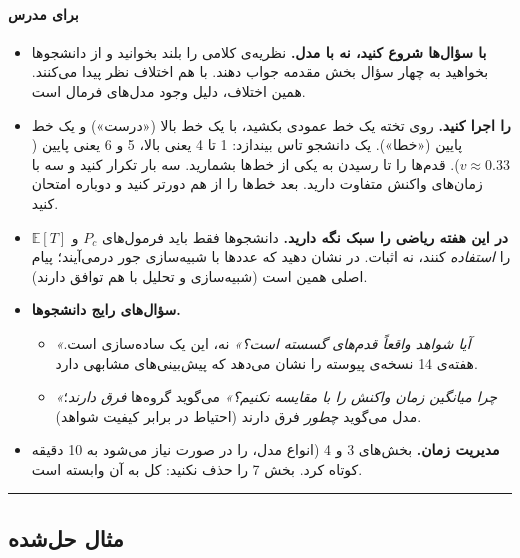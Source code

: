 \paragraph{برای مدرس}

\begin{itemize}
\tightlist
\item
  \textbf{با سؤال‌ها شروع کنید، نه با مدل.} نظریه‌ی کلامی را بلند بخوانید
  و از دانشجوها بخواهید به چهار سؤال بخش مقدمه جواب دهند. با هم اختلاف
  نظر پیدا می‌کنند. همین اختلاف، دلیل وجود مدل‌های فرمال است.
\item
  \textbf{ را اجرا کنید.} روی تخته یک خط عمودی بکشید، با
  یک خط بالا («درست») و یک خط پایین («خطا»). یک دانشجو تاس بیندازد: 1 تا
  4 یعنی بالا، 5 و 6 یعنی پایین (\(v \approx 0.33\)). قدم‌ها را تا رسیدن
  به یکی از خط‌ها بشمارید. سه بار تکرار کنید و سه  با زمان‌های
  واکنش متفاوت دارید. بعد خط‌ها را از هم دورتر کنید و دوباره امتحان کنید.
\item
  \textbf{در این هفته ریاضی را سبک نگه دارید.} دانشجوها فقط باید
  فرمول‌های \(P_c\) و \(\mathbb{E}[T]\) را \emph{استفاده} کنند، نه اثبات.
  در  نشان دهید که عددها با شبیه‌سازی جور درمی‌آیند؛ پیام اصلی
  همین است (شبیه‌سازی و تحلیل با هم توافق دارند).
\item
  \textbf{سؤال‌های رایج دانشجوها.}

  \begin{itemize}
  \tightlist
  \item
    \emph{«آیا شواهد واقعاً قدم‌های گسسته است؟»} نه، این یک ساده‌سازی است.
    هفته‌ی 14 نسخه‌ی پیوسته  را نشان می‌دهد که
    پیش‌بینی‌های مشابهی دارد.
  \item
    \emph{«چرا میانگین زمان واکنش را با  مقایسه نکنیم؟»}
     می‌گوید گروه‌ها \emph{فرق دارند}؛ مدل می‌گوید \emph{چطور}
    فرق دارند (احتیاط در برابر کیفیت شواهد).
  \end{itemize}
\item
  \textbf{مدیریت زمان.} بخش‌های 3 و 4 (انواع مدل،  را در صورت
  نیاز می‌شود به 10 دقیقه کوتاه کرد. بخش 7 را حذف نکنید: کل  به
  آن وابسته است.
\end{itemize}

\begin{center}\rule{0.5\linewidth}{0.5pt}\end{center}

\subsection{مثال حل‌شده}

